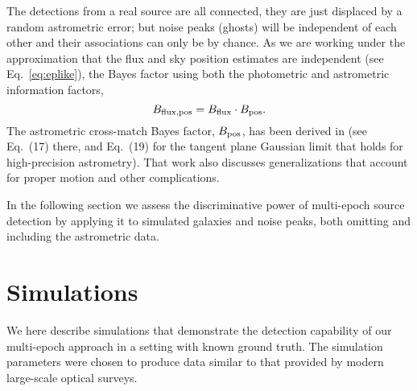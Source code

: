 \documentclass[twocolumn]{emulateapj}
\newcommand\enote[1]{ {\color{red}%
\marginpar[\raggedleft\large $\blacktriangleright$]%
{\raggedright\large $\blacktriangleleft$} %
{\large $\langle\langle\langle$}{\sl #1}{\large  $\rangle\rangle\rangle$} }}
\begin{document}
The detections from a real source are all connected, they are just displaced by a random astrometric error; but noise peaks (ghosts) will be independent of each other and their associations can only be by chance.
As we are working under the approximation that the flux and sky position estimates are independent (see Eq.~\ref{eq:eplike}), the Bayes factor using both the photometric and astrometric information factors,
%
\begin{equation}
B_{\rm{}flux,pos} = B_{\rm{}flux}\cdot{}B_{\rm{}pos}.
\end{equation}
%
The astrometric cross-match Bayes factor, $B_{\rm{}pos}$, has been derived in \cite{BL15-ARSA} (see Eq.~(17) there, and Eq.~(19) for the tangent plane Gaussian limit that holds for high-precision astrometry).
That work also discusses generalizations that account for proper motion and other complications.

In the following section we assess the discriminative power of multi-epoch source detection by applying it to simulated galaxies and noise peaks, both omitting and including the astrometric data.

\iffalse
\enote{It might be interesting to show astrometry-only results. They might correspond to allowing for arbitrary variability, so that no flux matching is expected at all. Use of variability models would then produce results between the pure astrometry and astrometry $+$ flux cases.}
\fi




\section{Simulations}
\label{sec:disc}

\noindent
We here describe simulations that demonstrate the detection capability of our multi-epoch approach in a setting with known ground truth.
The simulation parameters were chosen to produce data similar to that provided by modern large-scale optical surveys.


\end{document}
